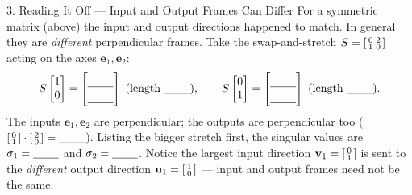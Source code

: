 \documentclass[10pt]{article}
\newcommand{\uu}{\mathbf{u}}
\newcommand{\vv}{\mathbf{v}}
\newcommand{\ee}{\mathbf{e}}
\begin{document}
\begin{notesbox}{3. Reading It Off --- Input and Output Frames Can Differ}
For a symmetric matrix (above) the input and output directions happened to match. In general they are
\emph{different} perpendicular frames. Take the swap-and-stretch
$S=\begin{bsmallmatrix} 0 & 2\\ 1 & 0 \end{bsmallmatrix}$ acting on the axes $\ee_1,\ee_2$:
\[
  S\begin{bmatrix} 1\\ 0 \end{bmatrix}=\begin{bmatrix}\rule{0pt}{1.1em}\blank{0.8cm}\\[2pt]\blank{0.8cm}\end{bmatrix}
  \ (\text{length }\blank{0.8cm}),\qquad
  S\begin{bmatrix} 0\\ 1 \end{bmatrix}=\begin{bmatrix}\rule{0pt}{1.1em}\blank{0.8cm}\\[2pt]\blank{0.8cm}\end{bmatrix}
  \ (\text{length }\blank{0.8cm}).
\]
The inputs $\ee_1,\ee_2$ are perpendicular; the outputs are perpendicular too
($\begin{bsmallmatrix} 0\\1 \end{bsmallmatrix}\cdot\begin{bsmallmatrix} 2\\0 \end{bsmallmatrix}=\blank{0.8cm}$).
Listing the bigger stretch first, the singular values are $\sigma_1=\blank{0.8cm}$ and
$\sigma_2=\blank{0.8cm}$. Notice the largest input direction $\vv_1=\begin{bsmallmatrix} 0\\1 \end{bsmallmatrix}$
is sent to the \emph{different} output direction $\uu_1=\begin{bsmallmatrix} 1\\0 \end{bsmallmatrix}$ ---
input and output frames need not be the same.
\end{notesbox}
\end{document}

